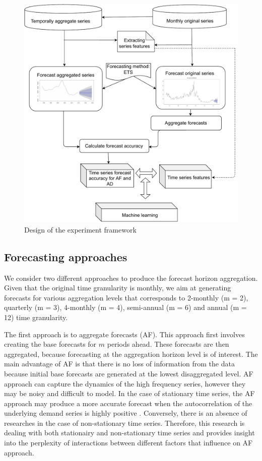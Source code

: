 \documentclass[preprint, 3p,
authoryear]{elsarticle} %
\begin{document}
\begin{figure}[H]

{\centering \includegraphics[width=0.7\linewidth]{img/300dpi/experiment_design} 

}

\caption{Design of the experiment framework}\label{fig:expdes}
\end{figure}

\hypertarget{forecasting-approaches}{%
\subsection{Forecasting approaches}\label{forecasting-approaches}}

We consider two different approaches to produce the forecast horizon
aggregation. Given that the original time granularity is monthly, we aim
at generating forecasts for various aggregation levels that corresponds
to 2-monthly (m = 2), quarterly (m = 3), 4-monthly (m = 4), semi-annual
(m = 6) and annual (m = 12) time granularity.

The first approach is to aggregate forecasts (AF). This approach first
involves creating the base forecasts for \(m\) periods ahead. These
forecasts are then aggregated, because forecasting at the aggregation
horizon level is of interest. The main advantage of AF is that there is
no loss of information from the data because initial base forecasts are
generated at the lowest disaggregated level. AF approach can capture the
dynamics of the high frequency series, however they may be noisy and
difficult to model. In the case of stationary time series, the AF
approach may produce a more accurate forecast when the autocorrelation
of the underlying demand series is highly positive
\citep{rostami2014note}. Conversely, there is an absence of researches
in the case of non-stationary time series. Therefore, this research is
dealing with both stationairy and non-stationary time series and
provides insight into the perplexity of interactions between different
factors that influence on AF approach.
\end{document}
